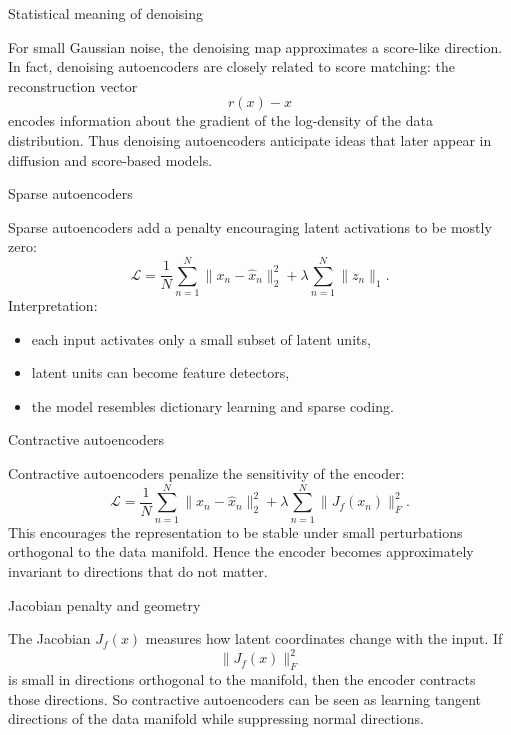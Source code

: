 \documentclass[aspectratio=169]{beamer}
\begin{document}
\begin{frame}{Statistical meaning of denoising}

For small Gaussian noise, the denoising map approximates a score-like direction.
In fact, denoising autoencoders are closely related to score matching:
the reconstruction vector
\[
r(x)-x
\]
encodes information about the gradient of the log-density of the data distribution.
Thus denoising autoencoders anticipate ideas that later appear in diffusion and score-based models.

\end{frame}

\begin{frame}{Sparse autoencoders}

Sparse autoencoders add a penalty encouraging latent activations to be mostly zero:
\[
\mathcal{L} =
\frac{1}{N}\sum_{n=1}^N \|x_n-\hat x_n\|_2^2
+\lambda \sum_{n=1}^N \|z_n\|_1.
\]
Interpretation:
\begin{itemize}
\item each input activates only a small subset of latent units,
\item latent units can become feature detectors,
\item the model resembles dictionary learning and sparse coding.
\end{itemize}

\end{frame}

\begin{frame}{Contractive autoencoders}

Contractive autoencoders penalize the sensitivity of the encoder:
\[
\mathcal{L} =
\frac{1}{N}\sum_{n=1}^N \|x_n-\hat x_n\|_2^2
+
\lambda \sum_{n=1}^N \|J_f(x_n)\|_F^2.
\]
This encourages the representation to be stable under small perturbations orthogonal to the data manifold.
Hence the encoder becomes approximately invariant to directions that do not matter.

\end{frame}

\begin{frame}{Jacobian penalty and geometry}

The Jacobian \(J_f(x)\) measures how latent coordinates change with the input.
If
\[
\|J_f(x)\|_F^2
\]
is small in directions orthogonal to the manifold, then the encoder contracts those directions.
So contractive autoencoders can be seen as learning tangent directions of the data manifold while suppressing normal directions.

\end{frame}
\end{document}
